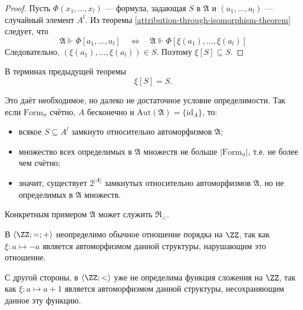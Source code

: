 \documentclass[12pt,a4paper]{article}
\newcommand{\Formul}{\ensuremath{\mathrm{Form}}\xspace}
\newcommand{\id}{\ensuremath{\mathrm{id}}\xspace}
\newcommand{\Aut}{\ensuremath{\mathrm{Aut}}\xspace}
\begin{document}
    \begin{proof}
        Пусть $\Phi(x_1, \dots, x_l)$ --- формула, задающая $S$ в $\mathfrak{A}$ и $(a_1, \dots, a_l)$ --- случайный элемент $A^l$. Из теоремы \ref{attribution-through-isomorphism-theorem} следует, что
        \[
            \mathfrak{A} \Vdash \Phi[a_1, \dots, a_l]
            \quad \Longleftrightarrow \quad
            \mathfrak{A} \Vdash \Phi[\xi(a_1), \dots, \xi(a_l)]
        \]
        Следовательно, $(\xi(a_1), \dots, \xi(a_l)) \in S$. Поэтому $\xi[S] \subseteq S$.
    \end{proof}
    
    \begin{corollary}
        В терминах предыдущей теоремы
        \[\xi[S] = S.\]
    \end{corollary}

    \begin{remark}
        Это даёт необходимое, но далеко не достаточное условие определимости. Так если $\Formul_\sigma$ счётно, $A$ бесконечно и $\Aut(\mathfrak{A}) = \{\id_A\}$, то:
        \begin{itemize}
            \item всякое $S \subseteq A^l$ замкнуто относительно автоморфизмов $\mathfrak{A}$;
            \item множество всех определимых в $\mathfrak{A}$ множеств не больше $|\Formul_\sigma|$, т.е. не более чем счётно;
            \item значит, существует $2^{|A|}$ замкнутых относительно автоморфизмов $\mathfrak{A}$, но не определимых в $\mathfrak{A}$ множеств.
        \end{itemize}

        Конкретным примером $\mathfrak{A}$ может служить \hyperlink{R_le-structure-definition}{$\mathfrak{R}_{<}$}.
    \end{remark}

    \begin{example}
        В $\langle \ZZ; =; + \rangle$ неопределимо обычное отношение порядка на $\ZZ$, так как $\xi: a \mapsto -a$ является автоморфизмом данной структуры, нарушающим это отношение.
    \end{example}

    \begin{example}
        С другой стороны, в $\langle \ZZ; {<} \rangle$ уже не определима функция сложения на $\ZZ$, так как $\xi: a \mapsto a + 1$ является автоморфизмом данной структуры, несохраняющим данное эту функцию.
    \end{example}
\end{document}

